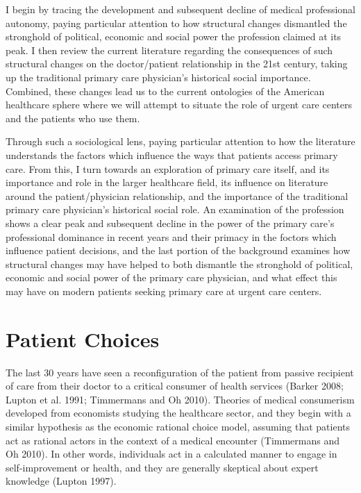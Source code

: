 \documentclass[12pt,twoside]{reedthesis}
\begin{document}
  I begin by tracing the development and subsequent decline of medical
  professional autonomy, paying particular attention to how structural
  changes dismantled the stronghold of political, economic and social
  power the profession claimed at its peak. I then review the current
  literature regarding the consequences of such structural changes on the
  doctor/patient relationship in the 21st century, taking up the
  traditional primary care physician's historical social importance.
  Combined, these changes lead us to the current ontologies of the
  American healthcare sphere where we will attempt to situate the role of
  urgent care centers and the patients who use them.
  
  Through such a sociological lens, paying particular attention to how the
  literature understands the factors which influence the ways that
  patients access primary care. From this, I turn towards an exploration
  of primary care itself, and its importance and role in the larger
  healthcare field, its influence on literature around the
  patient/physician relationship, and the importance of the traditional
  primary care physician's historical social role. An examination of the
  profession shows a clear peak and subsequent decline in the power of the
  primary care's professional dominance in recent years and their primacy
  in the foctors which influence patient decisions, and the last portion
  of the background examines how structural changes may have helped to
  both dismantle the stronghold of political, economic and social power of
  the primary care physician, and what effect this may have on modern
  patients seeking primary care at urgent care centers.
  
  \section*{Patient Choices}\label{patient-choices}
  
  The last 30 years have seen a reconfiguration of the patient from
  passive recipient of care from their doctor to a critical consumer of
  health services (Barker 2008; Lupton et al. 1991; Timmermans and Oh
  2010). Theories of medical consumerism developed from economists
  studying the healthcare sector, and they begin with a similar hypothesis
  as the economic rational choice model, assuming that patients act as
  rational actors in the context of a medical encounter (Timmermans and Oh
  2010). In other words, individuals act in a calculated manner to engage
  in self-improvement or health, and they are generally skeptical about
  expert knowledge (Lupton 1997).
  
\end{document}
